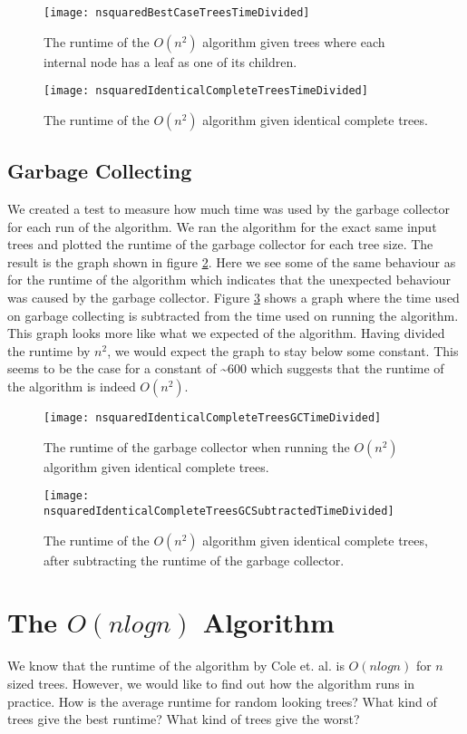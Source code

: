 \begin{figure}
	\texttt{[image: nsquaredBestCaseTreesTimeDivided]}
	\caption{The runtime of the $O(n^2)$ algorithm given trees where each internal node has a leaf as one of its children.}
	\label{nsquaredBestCaseTreesGraph}
	
	\texttt{[image: nsquaredIdenticalCompleteTreesTimeDivided]}
	\caption{The runtime of the $O(n^2)$ algorithm given identical complete trees.}
	\label{nsquaredIdenticalCompleteTreesGraph}
\end{figure}

\subsection{Garbage Collecting}
We created a test to measure how much time was used by the garbage collector for each run of the algorithm. We ran the algorithm for the exact same input trees and plotted the runtime of the garbage collector for each tree size. The result is the graph shown in figure \ref{nsquaredGCGraph}. Here we see some of the same behaviour as for the runtime of the algorithm which indicates that the unexpected behaviour was caused by the garbage collector. Figure \ref{nsquaredGCSubtractedGraph} shows a graph where the time used on garbage collecting is subtracted from the time used on running the algorithm. This graph looks more like what we expected of the algorithm. Having divided the runtime by $n^2$, we would expect the graph to stay below some constant. This seems to be the case for a constant of \textasciitilde 600 which suggests that the runtime of the algorithm is indeed $O(n^2)$.

\begin{figure}
	\texttt{[image: nsquaredIdenticalCompleteTreesGCTimeDivided]}
	\caption{The runtime of the garbage collector when running the $O(n^2)$ algorithm given identical complete trees.}
	\label{nsquaredGCGraph}
\end{figure}

\begin{figure}
	\texttt{[image: nsquaredIdenticalCompleteTreesGCSubtractedTimeDivided]}
	\caption{The runtime of the $O(n^2)$ algorithm given identical complete trees, after subtracting the runtime of the garbage collector.}
	\label{nsquaredGCSubtractedGraph}
\end{figure}

\section{The $O(nlogn)$ Algorithm}
We know that the runtime of the algorithm by Cole et. al. \cite{nlogn} is $O(nlogn)$ for $n$ sized trees. However, we would like to find out how the algorithm runs in practice. How is the average runtime for random looking trees? What kind of trees give the best runtime? What kind of trees give the worst?

